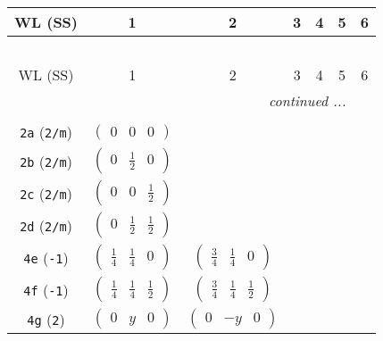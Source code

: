 \documentclass[fleqn,9pt,landscape]{jsarticle}
\begin{document}
\begin{center}
\renewcommand{\arraystretch}{1.2}
\begin{longtable}{ccccccc}
 \hline \hline
WL (SS) & 1 & 2 & 3 & 4 & 5 & 6 \\ \hline \endfirsthead

\multicolumn{6}{l}{\tablename\ \thetable{}} \\
 \hline \hline
WL (SS) & 1 & 2 & 3 & 4 & 5 & 6 \\ \hline \endhead

 \hline \hline
\multicolumn{6}{r}{\footnotesize\it continued ...} \\ \endfoot

 \hline \hline
\multicolumn{6}{r}{} \\ \endlastfoot

{\tt 2a} ({\tt 2/m}) & $ \begin{pmatrix} 0 & 0 & 0 \end{pmatrix} $ & $  $ & $  $ & $  $ \\ \hline
{\tt 2b} ({\tt 2/m}) & $ \begin{pmatrix} 0 & \frac{1}{2} & 0 \end{pmatrix} $ & $  $ & $  $ & $  $ \\ \hline
{\tt 2c} ({\tt 2/m}) & $ \begin{pmatrix} 0 & 0 & \frac{1}{2} \end{pmatrix} $ & $  $ & $  $ & $  $ \\ \hline
{\tt 2d} ({\tt 2/m}) & $ \begin{pmatrix} 0 & \frac{1}{2} & \frac{1}{2} \end{pmatrix} $ & $  $ & $  $ & $  $ \\ \hline
{\tt 4e} ({\tt -1}) & $ \begin{pmatrix} \frac{1}{4} & \frac{1}{4} & 0 \end{pmatrix} $ & $ \begin{pmatrix} \frac{3}{4} & \frac{1}{4} & 0 \end{pmatrix} $ & $  $ & $  $ \\ \hline
{\tt 4f} ({\tt -1}) & $ \begin{pmatrix} \frac{1}{4} & \frac{1}{4} & \frac{1}{2} \end{pmatrix} $ & $ \begin{pmatrix} \frac{3}{4} & \frac{1}{4} & \frac{1}{2} \end{pmatrix} $ & $  $ & $  $ \\ \hline
{\tt 4g} ({\tt 2}) & $ \begin{pmatrix} 0 & y & 0 \end{pmatrix} $ & $ \begin{pmatrix} 0 & - y & 0 \end{pmatrix} $ & $  $ & $  $ \\ \hline

\end{longtable}
\end{center}
\end{document}
